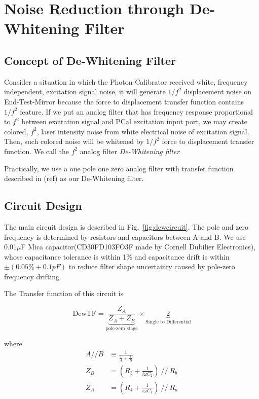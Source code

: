 

\chapter{Noise Reduction through De-Whitening Filter}

\section{Concept of De-Whitening Filter}
Consider a situation in which the Photon Calibrator received white, frequency independent, excitation signal noise, it will generate $1/f^2$ displacement noise on End-Test-Mirror because the force to displacement transfer function contains $1/f^2$ feature. If we put an analog filter that has frequency response proportional to $f^2$ between excitation signal and PCal excitation input port, we may create colored, $f^2$, laser intensity noise from white electrical noise of excitation signal. Then, such colored noise will be whitened by $1/f^2$ force to displacement transfer function. We call the $f^2$ analog filter \emph{De-Whitening filter }


Practically, we use a one pole one zero analog filter with transfer function described in (ref) as our De-Whitening filter. 


\section{Circuit Design}
The main circuit design is described in Fig.~\ref{fig:dewcircuit}. The pole and zero frequency is determined by resistors and capacitors between A and B. We use 0.01$\mu$F Mica capacitor(CD30FD103FO3F made by Cornell Dubilier Electronics), whose capacitance tolerance is within 1\% and capacitance drift is within $\pm(0.05\% +0.1 pF)$ to reduce filter shape uncertainty caused by pole-zero frequency drifting.

The Transfer function of this circuit is

\begin{equation}
\label{eq:dewtf}
    \mathrm{DewTF} = \underbrace{\frac{Z_A}{Z_A+Z_B}}_{\text{pole-zero stage}} \times \underbrace{2}_{\text{Single to Differential}}
\end{equation}


where
\begin{align}
    A//B &\equiv \frac{1}{\frac{1}{A}+\frac{1}{B}} \\
    Z_B &= ( R_3 + \frac{1}{i \omega C_2} )~ //~ R_b \\
    Z_A &= ( R_4 + \frac{1}{i \omega C_1} )~ //~ R_a
\end{align}

